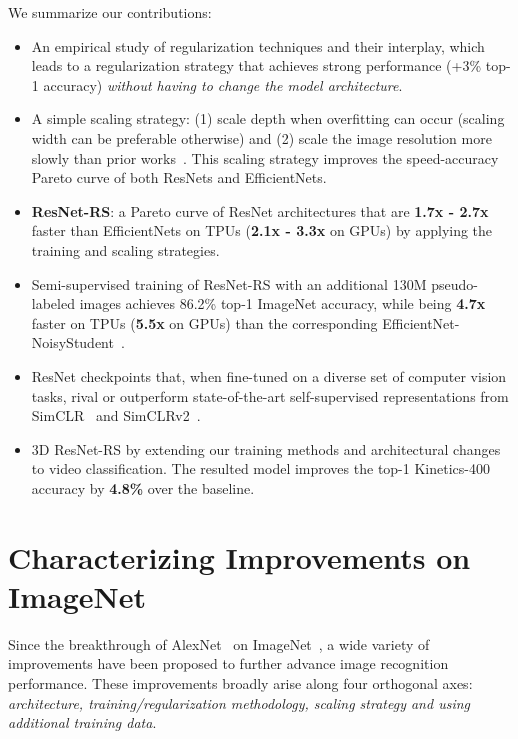 \documentclass{article}
\begin{document}
We summarize our contributions:
\begin{itemize}
    \itemsep0em
    \item An empirical study of regularization techniques and their interplay, which leads to a regularization strategy that achieves strong performance (+3\% top-1 accuracy) \emph{without having to change the model architecture}.
    \item A simple scaling strategy: (1) scale depth when overfitting can occur (scaling width can be preferable otherwise) and (2) scale the image resolution more slowly than prior works~\cite{tan2019efficientnet}. This scaling strategy improves the speed-accuracy Pareto curve of both ResNets and EfficientNets.
    \item \textbf{ResNet-RS}: a Pareto curve of ResNet architectures that are \textbf{1.7x - 2.7x} faster than EfficientNets on TPUs (\textbf{2.1x - 3.3x} on GPUs) by applying the training and scaling strategies.
    \item Semi-supervised training of ResNet-RS with an additional 130M pseudo-labeled images achieves 86.2\% top-1 ImageNet accuracy, while being \textbf{4.7x} faster on TPUs (\textbf{5.5x} on GPUs) than the corresponding EfficientNet-NoisyStudent~\cite{xie2020self}.
    \item ResNet checkpoints that, when fine-tuned on a diverse set of computer vision tasks, rival or outperform state-of-the-art self-supervised representations from SimCLR~\cite{chen2020simple} and SimCLRv2~\cite{chen2020big}.
    \item 3D ResNet-RS by extending our training methods and architectural changes to video classification. The resulted model improves the top-1 Kinetics-400 accuracy by \textbf{4.8\%} over the baseline. 
\end{itemize} \section{Characterizing Improvements on ImageNet}
Since the breakthrough of AlexNet~\cite{krizhevsky2012imagenet} on ImageNet~\cite{ilsvrc}, a wide variety of improvements have been proposed to further advance image recognition performance.
These improvements broadly arise along four orthogonal axes: \emph{architecture, training/regularization methodology, scaling strategy and using additional training data}.
\end{document}
